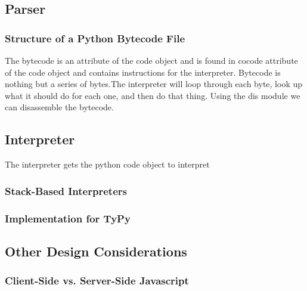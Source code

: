 \documentclass[10pt,a4paper]{article}
\begin{document}
\subsection{Parser}

\subsubsection{Structure of a Python Bytecode File}
The bytecode is an attribute of the code object and is found in cocode attribute of the code object and contains instructions for the interpreter. Bytecode is nothing but a series of bytes.The interpreter will loop through each byte, look up what it should do for each one, and then do that thing. Using the dis module we can disassemble the bytecode.



\subsection{Interpreter}
The interpreter gets the python code object to interpret

\subsubsection{Stack-Based Interpreters} 

\subsubsection{Implementation for TyPy}

\subsection{Other Design Considerations}
\subsubsection{Client-Side vs. Server-Side Javascript}
\end{document}
